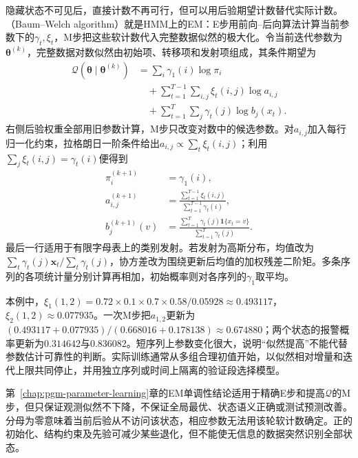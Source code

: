 隐藏状态不可见后，直接计数不再可行，但可以用后验期望计数替代实际计数。（Baum--Welch algorithm）就是HMM上的EM：E步用前向--后向算法计算当前参数下的$\gamma_t,\xi_t$，M步把这些软计数代入完整数据似然的极大化。令当前迭代参数为$\bm{\theta}^{(k)}$，完整数据对数似然由初始项、转移项和发射项组成，其条件期望为
\begin{equation}
  \begin{aligned}
    \mathcal{Q}(\bm{\theta}\mid\bm{\theta}^{(k)})
      &=\sum_i\gamma_1(i)\log\pi_i\\
      &\quad{}+\sum_{t=1}^{T-1}\sum_{i,j}
        \xi_t(i,j)\log a_{i,j}\\
      &\quad{}+\sum_{t=1}^{T}\sum_j
        \gamma_t(j)\log b_j(x_t).
  \end{aligned}
  \label{eq:pgm-dynamic-hmm-em-objective}
\end{equation}
右侧后验权重全部用旧参数计算，M步只改变对数中的候选参数。对$a_{i,j}$加入每行归一化约束，拉格朗日一阶条件给出$a_{i,j}\propto\sum_t\xi_t(i,j)$；利用$\sum_j\xi_t(i,j)=\gamma_t(i)$便得到
\begin{equation}
  \begin{aligned}
    \pi_i^{(k+1)}&=\gamma_1(i),\\
    a_{i,j}^{(k+1)}
      &=\frac{\sum_{t=1}^{T-1}\xi_t(i,j)}
        {\sum_{t=1}^{T-1}\gamma_t(i)},\\
    b_j^{(k+1)}(v)
      &=\frac{\sum_{t=1}^{T}
        \gamma_t(j)\mathbf{1}\{x_t=v\}}
        {\sum_{t=1}^{T}\gamma_t(j)}.
  \end{aligned}
  \label{eq:pgm-dynamic-baum-welch}
\end{equation}
最后一行适用于有限字母表上的类别发射。若发射为高斯分布，均值改为$\sum_t\gamma_t(j)\bm{x}_t/\sum_t\gamma_t(j)$，协方差改为围绕更新后均值的加权残差二阶矩。多条序列的各项统计量分别计算再相加，初始概率则对各序列的$\gamma_1$取平均。

本例中，$\xi_1(1,2)=0.72\times0.1\times0.7\times0.58/0.05928\approx0.493117$，$\xi_2(1,2)\approx0.077935$。一次M步把$a_{1,2}$更新为$(0.493117+0.077935)/(0.668016+0.178138)\approx0.674880$；两个状态的报警概率更新为$0.314642$与$0.836082$。短序列上参数变化很大，说明“似然提高”不能代替参数估计可靠性的判断。实际训练通常从多组合理初值开始，以似然相对增量和迭代上限共同停止，并用独立序列或时间上隔离的验证段选择模型。

第~\ref{chap:pgm-parameter-learning}章的EM单调性结论适用于精确E步和提高$\mathcal Q$的M步，但只保证观测似然不下降，不保证全局最优、状态语义正确或测试预测改善。分母为零意味着当前后验从不访问该状态，相应参数无法用该轮软计数确定。正的初始化、结构约束及先验可减少某些退化，但不能使无信息的数据突然识别全部状态。

